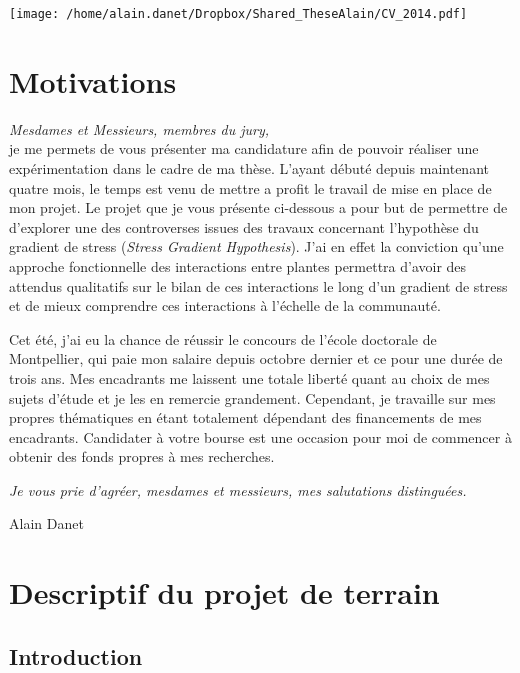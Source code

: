 \documentclass[12pt]{article} %
\begin{document}


\begin{center}
\texttt{[image: /home/alain.danet/Dropbox/Shared\_TheseAlain/CV\_2014.pdf]}
\end{center}

\section{Motivations}

\emph{Mesdames et Messieurs, membres du jury,}\\
je me permets de vous présenter ma candidature afin de pouvoir réaliser une expérimentation dans le cadre de ma thèse. L'ayant débuté depuis maintenant quatre mois, le temps est venu de mettre a profit le travail de mise en place de mon projet. Le projet que je vous présente ci-dessous a pour but de permettre de d'explorer une des controverses issues des travaux concernant l'hypothèse du gradient de stress (\textit{Stress Gradient Hypothesis}). J'ai en effet la conviction qu'une approche fonctionnelle des interactions entre plantes permettra d'avoir des attendus qualitatifs sur le bilan de ces interactions le long d'un gradient de stress et de mieux comprendre ces interactions à l'échelle de la communauté.

Cet été, j'ai eu la chance de réussir le concours de l'école doctorale de Montpellier, qui paie mon salaire depuis octobre dernier et ce pour une durée de trois ans. Mes encadrants me laissent une totale liberté quant au choix de mes sujets d'étude et je les en remercie grandement. Cependant, je travaille sur mes propres thématiques en étant totalement dépendant des financements de mes encadrants. Candidater à votre bourse est une occasion pour moi de commencer à obtenir des fonds propres à mes recherches.

\emph{Je vous prie d'agréer, mesdames et messieurs, mes salutations distinguées.}
\begin{flushright}
Alain Danet
\end{flushright}
\clearpage

\section{Descriptif du projet de terrain}

\subsection{Introduction}
\end{document}
